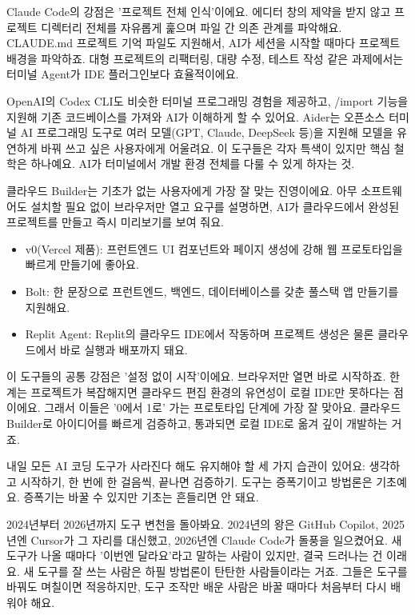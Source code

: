 Claude Code의 강점은 '프로젝트 전체 인식'이에요. 에디터 창의 제약을 받지 않고 프로젝트 디렉터리 전체를 자유롭게 훑으며 파일 간 의존 관계를 파악해요. CLAUDE.md 프로젝트 기억 파일도 지원해서, AI가 세션을 시작할 때마다 프로젝트 배경을 파악하죠. 대형 프로젝트의 리팩터링, 대량 수정, 테스트 작성 같은 과제에서는 터미널 Agent가 IDE 플러그인보다 효율적이에요.


OpenAI의 Codex CLI도 비슷한 터미널 프로그래밍 경험을 제공하고, /import 기능을 지원해 기존 코드베이스를 가져와 AI가 이해하게 할 수 있어요. Aider는 오픈소스 터미널 AI 프로그래밍 도구로 여러 모델(GPT, Claude, DeepSeek 등)을 지원해 모델을 유연하게 바꿔 쓰고 싶은 사용자에게 어울려요. 이 도구들은 각자 특색이 있지만 핵심 철학은 하나예요. AI가 터미널에서 개발 환경 전체를 다룰 수 있게 하자는 것.


클라우드 Builder는 기초가 없는 사용자에게 가장 잘 맞는 진영이에요. 아무 소프트웨어도 설치할 필요 없이 브라우저만 열고 요구를 설명하면, AI가 클라우드에서 완성된 프로젝트를 만들고 즉시 미리보기를 보여 줘요.

\begin{itemize}
  \item v0(Vercel 제품): 프런트엔드 UI 컴포넌트와 페이지 생성에 강해 웹 프로토타입을 빠르게 만들기에 좋아요.
  \item Bolt: 한 문장으로 프런트엔드, 백엔드, 데이터베이스를 갖춘 풀스택 앱 만들기를 지원해요.
  \item Replit Agent: Replit의 클라우드 IDE에서 작동하며 프로젝트 생성은 물론 클라우드에서 바로 실행과 배포까지 돼요.
\end{itemize}

이 도구들의 공통 강점은 '설정 없이 시작'이에요. 브라우저만 열면 바로 시작하죠. 한계는 프로젝트가 복잡해지면 클라우드 편집 환경의 유연성이 로컬 IDE만 못하다는 점이에요. 그래서 이들은 '0에서 1로' 가는 프로토타입 단계에 가장 잘 맞아요. 클라우드 Builder로 아이디어를 빠르게 검증하고, 통과되면 로컬 IDE로 옮겨 깊이 개발하는 거죠.


내일 모든 AI 코딩 도구가 사라진다 해도 유지해야 할 세 가지 습관이 있어요: 생각하고 시작하기, 한 번에 한 걸음씩, 끝나면 검증하기. 도구는 증폭기이고 방법론은 기초예요. 증폭기는 바꿀 수 있지만 기초는 흔들리면 안 돼요.

2024년부터 2026년까지 도구 변천을 돌아봐요. 2024년의 왕은 GitHub Copilot, 2025년엔 Cursor가 그 자리를 대신했고, 2026년엔 Claude Code가 돌풍을 일으켰어요. 새 도구가 나올 때마다 '이번엔 달라요'라고 말하는 사람이 있지만, 결국 드러나는 건 이래요. 새 도구를 잘 쓰는 사람은 하필 방법론이 탄탄한 사람들이라는 거죠. 그들은 도구를 바꿔도 며칠이면 적응하지만, 도구 조작만 배운 사람은 바꿀 때마다 처음부터 다시 배워야 해요.

